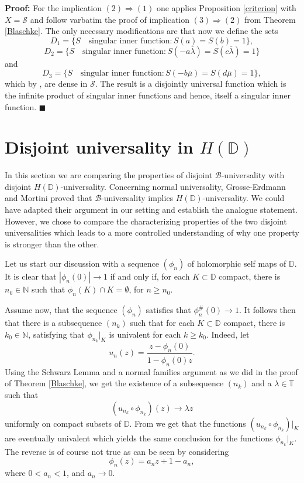 \documentclass[12pt,a4paper]{amsart}
\theoremstyle{plain}
\theoremstyle{definition}
\theoremstyle{remark}
\theoremstyle{fact}
\newenvironment{pf}
{\noindent\textbf{Proof:}}
{\hfill $\blacksquare$\par\medskip}
\begin{document}
\begin{pf}
        For the implication $(2)\Rightarrow (1)$ one applies Proposition \ref{criterion} with $X=\mathcal{S}$ and follow varbatim the proof of implication $(3)\Rightarrow (2)$ from Theorem \ref{Blaschke}. The only necessary modifications are that now we define the sets  
        $$
        D_1=\{S \quad \text{singular inner function}: S(a)=S(b)=1\},
        $$
        $$
        D_2=\{S \quad \text{singular inner function}: S(-a\overline{\lambda})=S(c\overline{\lambda})=1\}
        $$
        and
        $$
        D_3=\{S \quad \text{singular inner function}: S(-b\overline{\mu})=S(d\overline{\mu})=1\},
        $$
        which by \cite[Lemma 3.15]{Dave}, are dense in $\mathcal{S}$. The result is a disjointly universal function which is the infinite product of singular inner functions and hence, itself a singular inner function. 
    \end{pf}

    \section{Disjoint universality in $H(\mathbb{D})$}
    In this section we are comparing the properties of disjoint $\mathcal{B}$-universality with disjoint $H(\mathbb{D})$-universality. Concerning normal universality, Grosse-Erdmann and Mortini \cite{GrMo} proved that $\mathcal{B}$-universality implies $H(\mathbb{D})$-universality. We could have adapted their argument in our setting and establish the analogue statement. However, we chose to compare the characterizing properties of the two disjoint universalities which leads to a more controlled understanding of why one property is stronger than the other. 

    Let us start our discussion with a sequence $(\phi_n)$ of holomorphic self maps of $\mathbb{D}$. It is clear that $|\phi_n(0)|\rightarrow 1$ if and only if, for each $K\subset \mathbb{D}$ compact, there is $n_0\in \mathbb{N}$ such that $\phi_n(K)\cap K=\emptyset$, for $n\geq n_0$.

    Assume now, that the sequence $(\phi_n)$ satisfies that $\phi_n^\#(0)\rightarrow 1$. It follows then that there is a subsequence $(n_k)$ such that for each $K\subset \mathbb{D}$ compact, there is $k_0\in \mathbb{N}$, satisfying that $\phi_{n_k}|_K$ is univalent for each $k\geq k_0$. Indeed, let 
    $$
    u_n(z)=\frac{z-\phi_n(0)}{1-\overline{\phi_n(0)}z}.
    $$
    Using the Schwarz Lemma and a normal families argument as we did in the proof of Theorem \ref{Blaschke}, we get the existence of a subsequence $(n_k)$ and a $\lambda \in \mathbb{T}$ such that 
    $$
    (u_{n_k}\circ \phi_{n_k})(z)\rightarrow \lambda z
    $$ 
    uniformly on compact subsets of $\mathbb{D}$. From \cite[Lemma 5.1]{BGGM09} we get that the functions $(u_{n_k}\circ \phi_{n_k})|_K$ are eventually univalent which yields the same conclusion for the functions $\phi_{n_k}|_K$. The reverse is of course not true as can be seen by considering 
    $$
    \phi_n(z)=a_nz+1-a_n,
    $$
    where $0<a_n<1$, and $a_n\rightarrow 0$.
\end{document}
